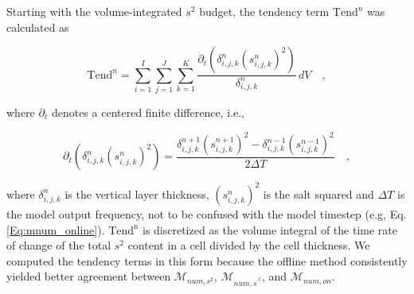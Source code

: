 \documentclass[draft]{agujournal2019}
\begin{document}
Starting with the volume-integrated $s^2$ budget, the tendency term $\mathrm{Tend}^n$ was calculated as
\begin{linenomath*}
    \begin{equation} \label{eq:append_tend}
        \mathrm{Tend}^n = \sum_{i=1}^{I}\sum_{j=1}^{J}\sum_{k=1}^{K} \frac{\partial_t (\delta_{i,j,k}^n (s_{i,j,k}^{n})^2)}{\delta_{i,j,k}^n} \, dV \quad ,
    \end{equation}
\end{linenomath*}
where $\partial_t$ denotes a centered finite difference, i.e., 
\begin{linenomath*}
    \begin{equation} \label{eq:append_finitediff}
        \partial_t (\delta_{i,j,k}^n (s_{i,j,k}^{n})^2) = \frac{\delta_{i,j,k}^{n+1} (s_{i,j,k}^{n+1})^2-\delta_{i,j,k}^{n-1} (s_{i,j,k}^{n-1})^2}{2 \Delta T} \quad ,
    \end{equation}
\end{linenomath*}
where $\delta_{i,j,k}^n$ is the vertical layer thickness, $(s_{i,j,k}^{n})^2$ is the salt squared and $\Delta T$ is the model output frequency, not to be confused with the model timestep (e.g, Eq. \ref{Eq:mnum_online}). $\mathrm{Tend^n}$ is discretized as the volume integral of the time rate of change of the total $s^2$ content in a cell divided by the cell thickness. We computed the tendency terms in this form because the offline method consistently yielded better agreement between $\mathcal{M}_{num,s^2}$, $\mathcal{M}_{num,s^{\prime^2}}$, and $\mathcal{M}_{num,on}$. 
\end{document}
